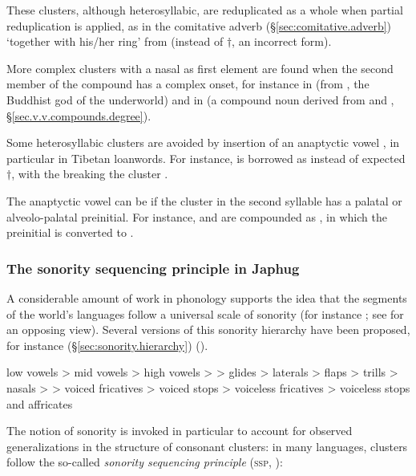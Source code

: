 These clusters, although heterosyllabic, are reduplicated as a whole when partial reduplication is applied, as in the comitative adverb (§\ref{sec:comitative.adverb})  `together with his/her ring' from  (instead of $\dagger$, an incorrect form).

More complex clusters with a nasal as first element are found when the second member of the compound has a complex onset, for instance   in  (from , the Buddhist god of the underworld) and \mbox{} in  (a compound noun derived from  and , §\ref{sec.v.v.compounds.degree}).

Some heterosyllabic clusters are avoided by insertion of an anaptyctic vowel , in particular in Tibetan loanwords. For instance,  is borrowed as  instead of expected $\dagger$, with the  breaking the cluster .

The  anaptyctic  vowel can be  if the cluster in the second syllable has a palatal or alveolo-palatal preinitial. For instance,   and  are compounded as , in which the preinitial  is converted to .

\subsubsection{The sonority sequencing principle in Japhug} \label{sec:ssp}
A considerable amount of work in phonology supports the idea that the segments of the world's languages follow a universal scale of sonority (for instance \citealt{vennemann88syllable, blevins95syllable}; see \citealt{ohala90sonority} for an opposing view). Several versions of this sonority hierarchy have been proposed, for instance  (§\ref{sec:sonority.hierarchy}) (\citealt[235]{parker02sonority}).

\begin{exe}
	\ex \label{sec:sonority.hierarchy}
	\glt low vowels > mid vowels > high vowels >  > glides > laterals > flaps
	> trills > nasals >  > voiced fricatives > voiced stops > voiceless
	fricatives > voiceless stops and affricates
\end{exe}

The notion of sonority is invoked in particular to account for observed generalizations in the structure of consonant clusters: in many languages, clusters follow the so-called \textit{sonority sequencing principle} (\textsc{ssp}, \citealt[210]{blevins95syllable}):

